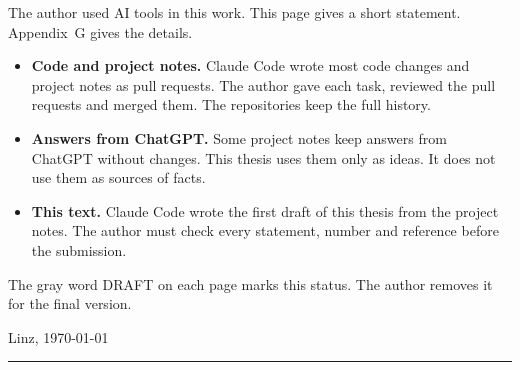 \cleardoubleoddpage
{}

The author used AI tools in this work. This page gives a short statement. Appendix~G gives the details.

\begin{itemize}
\item \textbf{Code and project notes.} Claude Code wrote most code changes and project notes as pull requests. The author gave each task, reviewed the pull requests and merged them. The repositories keep the full history.
\item \textbf{Answers from ChatGPT.} Some project notes keep answers from ChatGPT without changes. This thesis uses them only as ideas. It does not use them as sources of facts.
\item \textbf{This text.} Claude Code wrote the first draft of this thesis from the project notes. The author must check every statement, number and reference before the submission.
\end{itemize}

The gray word DRAFT on each page marks this status. The author removes it for the final version.

\vspace{1cm}
\noindent Linz, \today \hfill \rule{6cm}{0.4pt}\\
\hspace*{\fill}

